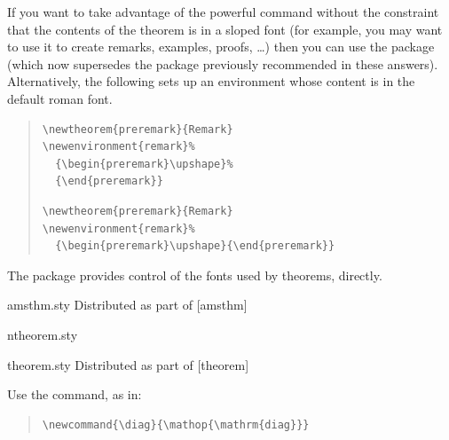 
If you want to take advantage of the powerful  command
without the constraint that the contents of the theorem is in a sloped
font (for example, you may want to use it to create remarks, examples, proofs,
\dots{}) then you can use the \AMSLaTeX{}  package
(which now supersedes the  package previously
recommended in these answers).
Alternatively, the following sets up an environment
 whose content is in the default roman font.
\begin{quote}
\begin{narrowversion}
\begin{verbatim}
\newtheorem{preremark}{Remark}
\newenvironment{remark}%
  {\begin{preremark}\upshape}%
  {\end{preremark}}
\end{verbatim}
\end{narrowversion}
\begin{wideversion}
\begin{verbatim}
\newtheorem{preremark}{Remark}
\newenvironment{remark}%
  {\begin{preremark}\upshape}{\end{preremark}}
\end{verbatim}
\end{wideversion}
\end{quote}
The  package provides control of the fonts used by
theorems, directly.
\begin{ctanrefs}
\item[amsthm.sty]Distributed as part of [amsthm]
\item[ntheorem.sty]
\item[theorem.sty]Distributed as part of [theorem]
\end{ctanrefs}


Use the  command, as in:
\begin{quote}
\begin{verbatim}
\newcommand{\diag}{\mathop{\mathrm{diag}}}
\end{verbatim}
\end{quote}

